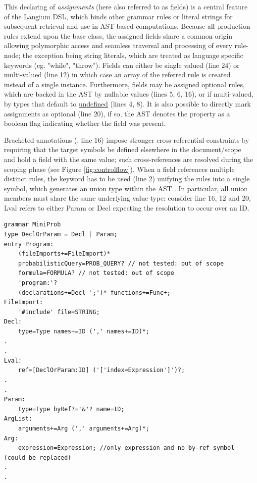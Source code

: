 This declaring of \textit{assignments} (here also referred to as fields) is a central feature of the Langium DSL, which binds other grammar rules or literal strings for subsequent retrieval and use in AST-based computations.
Because all production rules extend upon the  base class, the assigned fields share a common origin allowing polymorphic access and seamless traversal and processing of every rule-node;
the exception being string literals, which are treated as language specific keywords (eg. "while", "throw"). Fields can either be single valued (line 24) or multi-valued (line 12)
in which case an array of the referred rule is created instead of a single instance.
Furthermore, fields may be assigned optional rules, which are backed in the AST by nullable values (lines 5, 6, 16), or if multi-valued,
by types that default to \underline{undefined} (lines 4, 8). It is also possible to directly mark assignments as optional (line 20), if so,
the AST denotes the property as a boolean flag indicating whether the field was present.

Bracketed annotations (, line 16) impose stronger cross-referential constraints by requiring
that the target symbols be defined elsewhere in the document/scope and hold a field with the same value; such cross-references are resolved during the scoping phase (see Figure \ref{fig:controlflow}).
When a field references multiple distinct rules, the  keyword has to be used (line 2) unifying the rules into a single symbol, which generates an union type within the AST \cite{typescript-unions-intersections}.
In particular, all union members must share the same underlying value type: consider line 16, 12 and 20, Lval refers to either Param or Decl expecting the resolution to occur
over an ID.

\begin{verbatim}
grammar MiniProb
type DeclOrParam = Decl | Param;
entry Program:
    (fileImports+=FileImport)*
    probabilisticQuery=PROB_QUERY? // not tested: out of scope
    formula=FORMULA? // not tested: out of scope
    'program:'?
    (declarations+=Decl ';')* functions+=Func+;
FileImport:
    '#include' file=STRING;
Decl:
    type=Type names+=ID (',' names+=ID)*;
.
.
Lval:
    ref=[DeclOrParam:ID] ('['index=Expression']')?;
.
.
Param:
    type=Type byRef?='&'? name=ID;
ArgList:
    arguments+=Arg (',' arguments+=Arg)*;
Arg:
    expression=Expression; //only expression and no by-ref symbol (could be replaced)
.
.
\end{verbatim}

